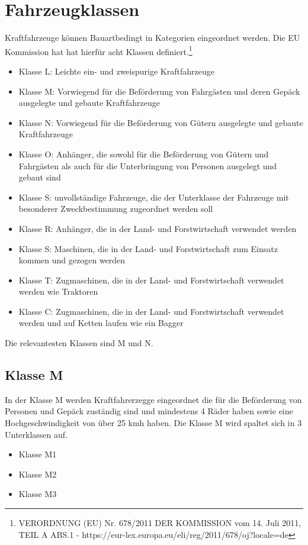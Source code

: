 \section{Fahrzeugklassen}

Kraftfahrzeuge können Bauartbedingt in Kategorien eingeordnet werden.
Die EU Kommission hat hat hierfür acht Klassen definiert.\footnote{VERORDNUNG (EU) Nr. 678/2011 DER KOMMISSION
	vom 14. Juli 2011, TEIL A ABS.1 - https://eur-lex.europa.eu/eli/reg/2011/678/oj?locale=de}

\begin{itemize}
	\item Klasse L: Leichte ein- und zweispurige Kraftfahrzeuge
	\item Klasse M: Vorwiegend für die Beförderung von Fahrgästen und deren Gepäck ausgelegte und gebaute Kraftfahrzeuge
	\item Klasse N: Vorwiegend für die Beförderung von Gütern ausgelegte und gebaute Kraftfahrzeuge
	\item Klasse O: Anhänger, die sowohl für die Beförderung von Gütern und Fahrgästen als auch für die Unterbringung von Personen ausgelegt und gebaut sind
	\item Klasse S: unvollständige Fahrzeuge, die der Unterklasse der Fahrzeuge mit besonderer Zweckbestimmung zugeordnet werden soll
	\item Klasse R: Anhänger, die in der Land- und Forstwirtschaft verwendet werden
	\item Klasse S: Maschinen, die in der Land- und Forstwirtschaft zum Einsatz kommen und gezogen werden
	\item Klasse T: Zugmaschinen, die in der Land- und Forstwirtschaft verwendet werden wie Traktoren
	\item Klasse C: Zugmaschinen, die in der Land- und Forstwirtschaft verwendet werden und auf Ketten laufen wie ein Bagger
\end{itemize}

Die relevantesten Klassen sind M und N.

\subsection{Klasse M}
In der Klasse M werden Kraftfahrerzegge eingeordnet die für die Beförderung von Personen und Gepäck zuständig sind und mindestens 4 Räder haben sowie eine Hochgeschwindigkeit von über 25 \ac{kmh} haben.
\newline
Die Klasse M wird spaltet sich in 3 Unterklassen auf.
\begin{itemize}
	\item {Klasse M1}
	\item {Klasse M2}
	\item {Klasse M3}
\end{itemize}
